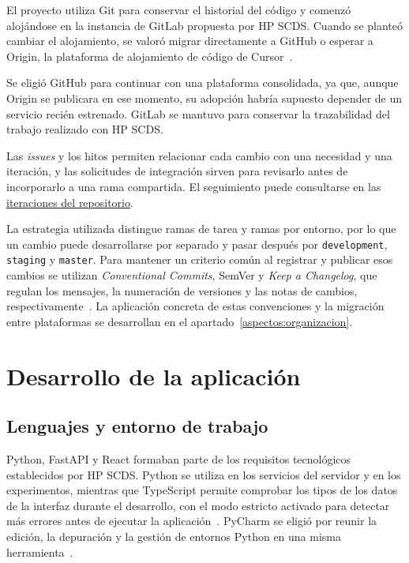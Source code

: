 El proyecto utiliza Git para conservar el historial del código y comenzó
alojándose en la instancia de GitLab propuesta por HP SCDS. Cuando se
planteó cambiar el alojamiento, se valoró migrar directamente a GitHub o
esperar a Origin, la plataforma de alojamiento de código de
Cursor~\cite{cursor_origin}.

Se eligió GitHub para continuar con una plataforma consolidada, ya que,
aunque Origin se publicara en ese momento, su adopción habría supuesto
depender de un servicio recién estrenado. GitLab se mantuvo para conservar
la trazabilidad del trabajo realizado con HP SCDS.

Las \textit{issues} y los hitos permiten relacionar cada cambio con una
necesidad y una iteración, y las solicitudes de integración sirven para
revisarlo antes de incorporarlo a una rama compartida. El seguimiento puede
consultarse en las
\href{https://github.com/ibaimoya/manualito/milestones?state=closed}{iteraciones
del repositorio}.

La estrategia utilizada distingue ramas de tarea y ramas por entorno, por
lo que un cambio puede desarrollarse por separado y pasar después por
\texttt{development}, \texttt{staging} y \texttt{master}. Para mantener un
criterio común al registrar y publicar esos cambios se utilizan
\textit{Conventional Commits}, SemVer y \textit{Keep a Changelog}, que regulan
los mensajes, la numeración de versiones y las notas de cambios,
respectivamente~\cite{conventional_commits,semantic_versioning,keep_a_changelog}.
La aplicación concreta de estas convenciones y la migración entre
plataformas se desarrollan en el apartado~\ref{aspectos:organizacion}.

\section{Desarrollo de la aplicación}

\subsection{Lenguajes y entorno de trabajo}

Python, FastAPI y React formaban parte de los requisitos tecnológicos
establecidos por HP SCDS. Python se utiliza en los servicios del servidor
y en los experimentos, mientras que TypeScript permite comprobar los tipos
de los datos de la interfaz durante el desarrollo, con el modo estricto
activado para detectar más errores antes de ejecutar la
aplicación~\cite{typescript_strict}.
PyCharm se eligió por reunir la edición, la depuración y la gestión de
entornos Python en una misma herramienta~\cite{pycharm_documentacion}.

